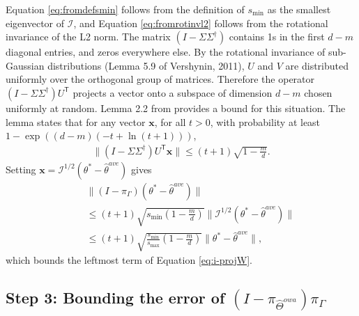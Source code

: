 \documentclass[twoside]{article}
\newcommand{\smin}{s_\text{min}}
\newcommand{\smax}{s_\text{max}}
\newcommand{\Wowa}{{\hat \Theta^{\textit{owa}}}}
\newcommand{\x}{\mathbf{x}}
\newcommand{\w}{\theta}
\newcommand{\wave}{\hat\w^{ave}}
\newcommand{\wstar}{{\w^{*}}}
\newcommand{\I}{\mathcal I}
\newcommand{\trans}[1]{\ensuremath{{#1}^{\mathsf{T}}}}
\newcommand{\pinv}[1]{\ensuremath{{#1}^{\mathsf{\dagger}}}}
\newcommand{\ltwo}[1]{{\lVert {#1} \rVert}}
\newcommand{\proj}[1]{\pi_{{#1}}}
\begin{document}
Equation \ref{eq:fromdefsmin} follows from the definition of $\smin$ as the smallest eigenvector of $\I$,
and Equation \ref{eq:fromrotinvl2} follows from the rotational invariance of the L2 norm.
The matrix $(I-\Sigma\pinv\Sigma)$ contains 1s in the first $d-m$ diagonal entries, and zeros everywhere else.
By the rotational invariance of sub-Gaussian distributions (Lemma 5.9 of Vershynin, 2011),
$U$ and $V$ are distributed uniformly over the orthogonal group of matrices.
Therefore the operator $(I-\Sigma\pinv\Sigma)\trans U$ projects a vector onto a subspace of dimension $d-m$ chosen uniformly at random.
Lemma 2.2 from \citet{dasgupta2003elementary} provides a bound for this situation.
The lemma states that for any vector $\x$, for all $t>0$, with probability at least $1-\exp((d-m)(-t+\ln (t+1)))$,
\begin{align}
\ltwo{(I-\Sigma\pinv\Sigma)\trans U \x} \le (t+1) \sqrt{1-\frac{m}{d}}
.
\label{eq:dasgupta}
\end{align}
Setting $\x=\I^{1/2}(\wstar-\wave)$ gives
\begin{align}
~~~~~&\!\!\!\!\!\!\!\!\!\!\!\ltwo{(I-\proj\Gamma)(\wstar-\wave)}
\nonumber
\\
&\le
(t+1)\sqrt{\smin\left(1-\frac{m}{d}\right)}\ltwo{\I^{1/2}(\wstar - \wave)}
\\
&\le
(t+1)\sqrt{\frac{\smin}{\smax}\left(1-\frac{m}{d}\right)}\ltwo{\wstar - \wave}
,
\end{align}
which bounds the leftmost term of Equation \ref{eq:i-projW}.


\subsection*{Step 3: Bounding the error of $(I-\proj{\Wowa})\proj{\Gamma}$}
\end{document}
